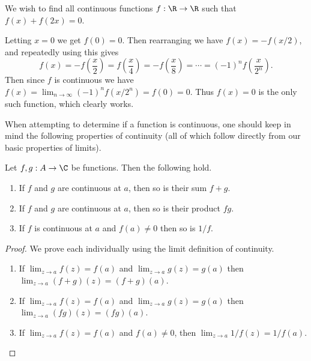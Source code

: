\documentclass[a4paper]{scrartcl}
\begin{document}
\begin{example}
	We wish to find all continuous functions $f: \R \rightarrow \R$  such that $f(x) + f(2x) = 0$.

	Letting $x = 0$ we get $f(0) = 0$. Then rearranging we have
	$f(x) = -f(x/2)$, and repeatedly using this gives
	$$
	f(x) = -f\left(\frac{x}{2}\right) = f\left(\frac{x}{4}\right) = -f\left(\frac{x}{8}\right) = \cdots = (-1)^{n}f\left(\frac{x}{2^n}\right).
	$$
	Then since $f$ is continuous we have $f(x) = \lim_{n \to \infty} (-1)^n f(x/2^n) = f(0) = 0$. Thus $f(x) = 0$ is the only such function, which clearly works.
\end{example}


When attempting to determine if a function is continuous, one should keep in mind the following properties of continuity (all of which follow directly from our basic properties of limits).

\begin{proposition}
	Let $f, g: A \rightarrow \C$ be functions. Then the following hold.
	\begin{enumerate}[label=(\roman*)]
		\item If $f$ and $g$ are continuous at $a$, then so is their sum $f + g$.
		\item If $f$ and $g$ are continuous at $a$, then so is their product $fg$.
		\item If $f$ is continuous at $a$ and $f(a) \neq 0$ then so is $1/f$.
	\end{enumerate}
\end{proposition}
\begin{proof}
	We prove each individually using the limit definition of continuity.
	\begin{enumerate}[label=(\roman*)]
		\item If $\displaystyle\lim_{z \to a} f(z) = f(a)$ and $\displaystyle\lim_{z \to a} g(z) = g(a)$ then $\displaystyle\lim_{z \to a} (f+g)(z) = (f+g)(a)$.
		\item If $\displaystyle\lim_{z \to a} f(z) = f(a)$ and $\displaystyle\lim_{z \to a} g(z) = g(a)$ then $\displaystyle\lim_{z \to a} (fg)(z) = (fg)(a)$.
		\item If $\displaystyle\lim_{z \to a} f(z) = f(a)$ and $f(a) \neq 0$, then $\displaystyle\lim_{z \to a} 1/f(z) = 1/f(a)$.
		 \qedhere
	\end{enumerate}
\end{proof}
\end{document}
